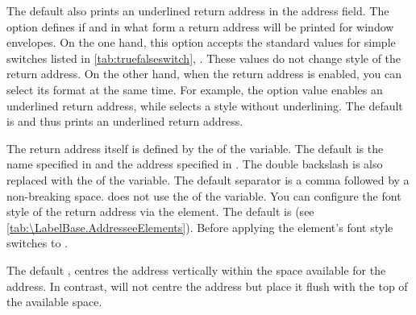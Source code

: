 The default  also prints an underlined return
address in the address field. The  option defines if and
in what form a return address will be printed for window envelopes. On the one
hand, this option accepts the
standard values for simple switches listed in \autoref{tab:truefalseswitch},
. These values do not change style of the
return address. On the other hand, when the
return address is enabled, you can select its format at the same time. For
example, the  option value enables an underlined return
address, while 
selects a style without underlining. The default is  and
thus prints an underlined return address.

The return address itself is defined by the  of the
 variable. The default is the name specified in
 and the address specified in
. The double backslash is also
replaced with the  of the 
variable. The default separator is a comma followed by a non-breaking space.
\KOMAScript{} does not use the  of the
 variable.
\BeginIndexGroup{}%
%
You can configure the font style of the return address via the
 element. The
default is  (see \autoref{tab:\LabelBase.AddresseeElements}).
Before applying the element's font style \KOMAScript{} switches to
.%
\EndIndexGroup

The default , centres the address vertically
within the space available for the address.
In contrast,
%
 will not centre the address
but place it flush with the top of the available space.%

